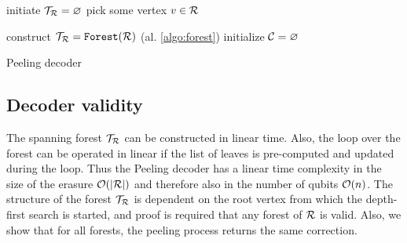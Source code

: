 \begin{algorithm}[htb]
  \BlankLine
  \BlankLine
  initiate $\mathcal{T}_{\mathcal{R}} = \varnothing$ \;
  pick some vertex $v \in \mathcal{R}$ \;
  \BlankLine
  \caption{}\label{algo:forest}
\end{algorithm}



\begin{algorithm}[htb]
  \BlankLine
  \BlankLine
  construct $\mathcal{T}_{\mathcal{R}} = \texttt{Forest}(\mathcal{R})$ (al. \ref{algo:forest})\;
  initialize $\mathcal{C} = {\varnothing}$\;
  \BlankLine
  \caption{Peeling decoder \cite{delfosse2017linear}}\label{algo:peel}
\end{algorithm}

\subsection{Decoder validity}
The spanning forest $\mathcal{T}_{\mathcal{R}}$ can be constructed in linear time. Also, the loop over the forest can be operated in linear if the list of leaves is pre-computed and updated during the loop. Thus the Peeling decoder has a linear time complexity in the size of the erasure $\mathcal{O}(\abs{\mathcal{R}})$ and therefore also in the number of qubits $\mathcal{O}(n)$. The structure of the forest $\mathcal{T}_{\mathcal{R}}$ is dependent on the root vertex from which the depth-first search is started, and proof is required that any forest of $\mathcal{R}$ is valid. Also, we show that for all forests, the peeling process returns the same correction.

